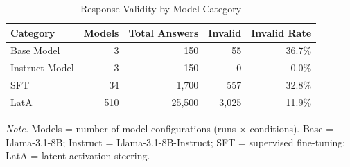 \begin{table}[htbp]
\begin{threeparttable}
\caption{Response Validity by Model Category}
\label{tab:category_validity}
\centering
\begin{tabular}{lrrrr}
\toprule
Category & Models & Total Answers & Invalid & Invalid Rate \\
\midrule
  Base Model & 3 & 150 & 55 & 36.7\% \\
  Instruct Model & 3 & 150 & 0 & 0.0\% \\
  SFT & 34 & 1,700 & 557 & 32.8\% \\
  LatA & 510 & 25,500 & 3,025 & 11.9\% \\
\bottomrule
\end{tabular}
\begin{tablenotes}
\footnotesize
\item \textit{Note.} Models = number of model configurations (runs $\times$ conditions). Base = Llama-3.1-8B; Instruct = Llama-3.1-8B-Instruct; SFT = supervised fine-tuning; LatA = latent activation steering.
\end{tablenotes}
\end{threeparttable}
\end{table}